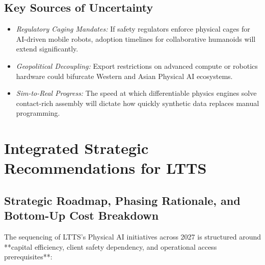 \documentclass[11pt,a4paper]{article}
\begin{document}
\subsection{Key Sources of Uncertainty}
\begin{itemize}
    \item \textit{Regulatory Caging Mandates:} If safety regulators enforce physical cages for AI-driven mobile robots, adoption timelines for collaborative humanoids will extend significantly.
    \item \textit{Geopolitical Decoupling:} Export restrictions on advanced compute or robotics hardware could bifurcate Western and Asian Physical AI ecosystems.
    \item \textit{Sim-to-Real Progress:} The speed at which differentiable physics engines solve contact-rich assembly will dictate how quickly synthetic data replaces manual programming.
\end{itemize}

\section{Integrated Strategic Recommendations for LTTS}

\subsection{Strategic Roadmap, Phasing Rationale, and Bottom-Up Cost Breakdown}
The sequencing of LTTS's Physical AI initiatives across 2027 is structured around **capital efficiency, client safety dependency, and operational access prerequisites**:
\end{document}
